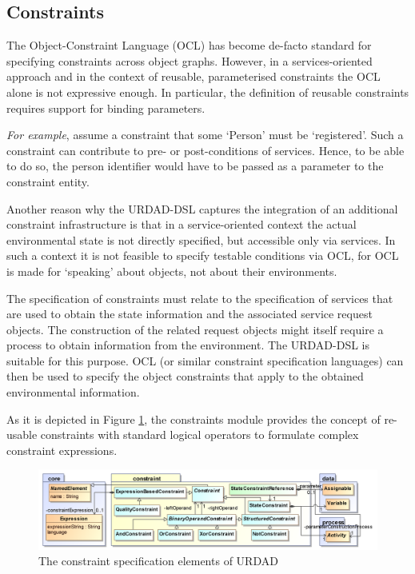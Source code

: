 \subsection{Constraints}

The Object-Constraint Language (OCL) has become de-facto standard for specifying constraints across object graphs. However, in a services-oriented approach and in the context of reusable, parameterised constraints the OCL alone is 
not expressive enough. In particular, the definition of reusable constraints requires support for binding parameters. 

\emph{For example}, assume a constraint that some `Person' must be `registered'. Such a constraint can contribute to pre- or post-conditions of services. Hence, to be able to do so, the person identifier would have to be passed as a parameter to the constraint entity.

Another reason why the URDAD-DSL captures the integration of an additional constraint infrastructure is that in a service-oriented context the actual environmental state is not directly specified, but accessible only via services. In such a context it is not feasible to specify testable conditions via OCL, for OCL is made for `speaking' about objects, not about their environments.

The specification of constraints must relate to the specification of services that are used to obtain the state information and the associated service request objects. The construction of the related request objects might itself require a process to obtain information from the environment. The URDAD-DSL is suitable for this purpose. OCL (or similar constraint specification languages) can then be used to specify the object constraints that apply to the obtained environmental information.

As it is depicted in Figure \ref{fig:metamodel-2}, the constraints module provides the concept of re-usable constraints with standard logical operators to formulate complex constraint expressions.
\begin{figure}[Htbp]
  \centering
  \includegraphics{constraint}
  \caption{The constraint specification elements of URDAD}
  \label{fig:metamodel-2}
\end{figure}

